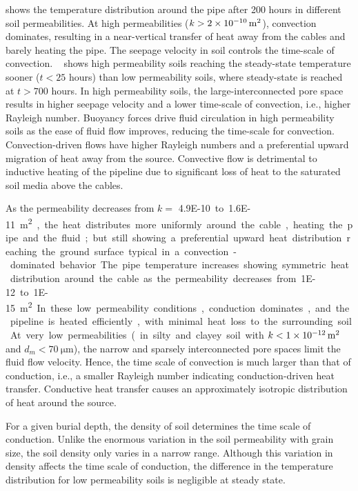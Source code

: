 \documentclass[Journal,letterpaper,InsideFigs]{ascelike-new}
\begin{document}
 shows the temperature distribution around the pipe after 200 hours in different soil permeabilities. At high permeabilities ($k > \SI{2E-10}{\meter\squared}$), convection dominates, resulting in a near-vertical transfer of heat away from the cables and barely heating the pipe. The seepage velocity in soil controls the time-scale of convection. ~ shows high permeability soils reaching the steady-state temperature sooner ($t < 25$ hours) than low permeability soils, where steady-state is reached at $t > 700$ hours. In high permeability soils, the large-interconnected pore space results in higher seepage velocity and a lower time-scale of convection, i.e., higher Rayleigh number. Buoyancy forces drive fluid circulation in high permeability soils as the ease of fluid flow improves, reducing the time-scale for convection. Convection-driven flows have higher Rayleigh numbers and a preferential upward migration of heat away from the source. Convective flow is detrimental to inductive heating of the pipeline due to significant loss of heat to the saturated soil media above the cables.

As the permeability decreases from $k =$ \SI{4.9E-10} to \SI{1.6E-11}{\meter\squared}, the heat distributes more uniformly around the cable, heating the pipe and the fluid; but still showing a preferential upward heat distribution reaching the ground surface typical in a convection-dominated behavior. The pipe temperature increases showing symmetric heat distribution around the cable as the permeability decreases from \SI{1E-12} to \SI{1E-15}{\meter\squared}. In these low permeability conditions, conduction dominates, and the pipeline is heated efficiently, with minimal heat loss to the surrounding soil. At very low permeabilities (in silty and clayey soil with $k < \SI{1E-12}{\meter\squared}$ and $d_m < \SI{70}{\micro\meter}$), the narrow and sparsely interconnected pore spaces limit the fluid flow velocity. Hence, the time scale of convection is much larger than that of conduction, i.e., a smaller Rayleigh number indicating conduction-driven heat transfer. Conductive heat transfer causes an approximately isotropic distribution of heat around the source. 

For a given burial depth, the density of soil determines the time scale of conduction. Unlike the enormous variation in the soil permeability with grain size, the soil density only varies in a narrow range. Although this variation in density affects the time scale of conduction, the difference in the temperature distribution for low permeability soils is negligible at steady state. 
\end{document}
